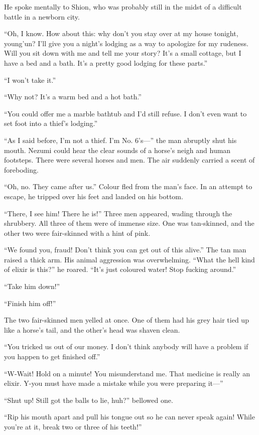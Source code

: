 He spoke mentally to Shion, who was probably still in the midst of a
difficult battle in a newborn city.

``Oh, I know. How about this: why don't you stay over at my house
tonight, young'un? I'll give you a night's lodging as a way to apologize
for my rudeness. Will you sit down with me and tell me your story? It's
a small cottage, but I have a bed and a bath. It's a pretty good lodging
for these parts.''

``I won't take it.''

``Why not? It's a warm bed and a hot bath.''

``You could offer me a marble bathtub and I'd still refuse. I don't even
want to set foot into a thief's lodging.''

``As I said before, I'm not a thief. I'm No. 6's---'' the man abruptly shut
his mouth. Nezumi could hear the clear sounds of a horse's neigh and
human footsteps. There were several horses and men. The air suddenly
carried a scent of foreboding.

``Oh, no. They came after us.'' Colour fled from the man's face. In an
attempt to escape, he tripped over his feet and landed on his bottom.

``There, I see him! There he is!'' Three men appeared, wading through
the shrubbery. All three of them were of immense size. One was
tan-skinned, and the other two were fair-skinned with a hint of pink.

``We found you, fraud! Don't think you can get out of this alive.'' The
tan man raised a thick arm. His animal aggression was overwhelming.
``What the hell kind of elixir is this?'' he roared. ``It's just
coloured water! Stop fucking around.''

``Take him down!''

``Finish him off!''

The two fair-skinned men yelled at once. One of them had his grey hair
tied up like a horse's tail, and the other's head was shaven clean.

``You tricked us out of our money. I don't think anybody will have a
problem if you happen to get finished off.''

``W-Wait! Hold on a minute! You misunderstand me. That medicine is
really an elixir. Y-you must have made a mistake while you were
preparing it---''

``Shut up! Still got the balls to lie, huh?'' bellowed one.

``Rip his mouth apart and pull his tongue out so he can never speak
again! While you're at it, break two or three of his teeth!''

